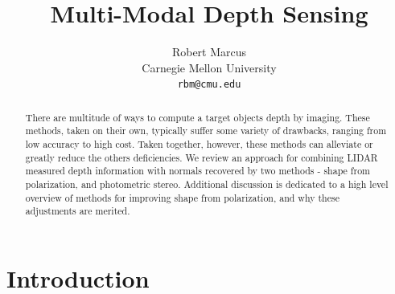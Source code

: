 \documentclass[final]{cvpr}
\begin{document}
\title{Multi-Modal Depth Sensing}

\author{Robert Marcus\\
Carnegie Mellon University\\
{\tt\small rbm@cmu.edu}
{\tt\small}
}

\maketitle


\begin{abstract}
	There are multitude of ways to compute a target objects depth by imaging. These methods, taken on their own, typically suffer some variety of drawbacks, ranging from low accuracy to high cost. Taken together, however, these methods can alleviate or greatly reduce the others deficiencies. We review an approach for combining LIDAR measured depth information with normals recovered by two methods - shape from polarization, and photometric stereo. Additional discussion is dedicated to a high level overview of methods for improving shape from polarization, and why these adjustments are merited.  
\end{abstract}

\section{Introduction}
\end{document}
